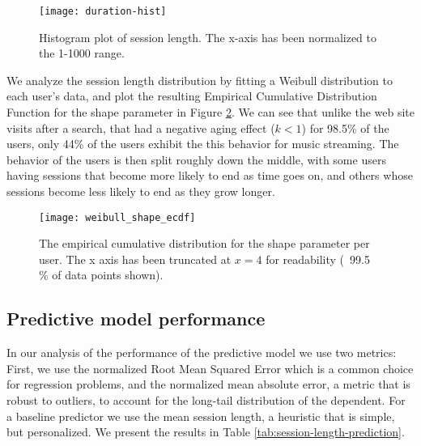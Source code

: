 \begin{figure}
	\centering
	\texttt{[image: duration-hist]}
	\caption{Histogram plot of session length. The x-axis has been normalized to the 1-1000 range.}
	\label{fig:session-length-times}
\end{figure}

We analyze the session length distribution by fitting a Weibull distribution
to each user's data, and plot the resulting Empirical Cumulative Distribution
Function for the shape parameter in Figure \ref{fig:session-length-shapes}.
We can see that unlike the web site visits after a search, that had a negative aging
effect ($k < 1$) for 98.5\% of the users, only 44\% of the users exhibit the
this behavior for music streaming. The behavior of the users is then split
roughly down the middle, with some users having sessions that become more likely
to end as time goes on, and others whose sessions become less likely to end as
they grow longer.


\begin{figure}
	\centering
	\texttt{[image: weibull\_shape\_ecdf]}
	\caption{The empirical cumulative distribution for the shape parameter per user.
		The x axis has been truncated at $x=4$ for readability (~99.5 \% of data points shown).}
	\label{fig:session-length-shapes}
\end{figure}

\subsection{Predictive model performance}

In our analysis of the performance of the predictive model we use two metrics:
First, we use the normalized Root Mean Squared Error which is a common choice
for regression problems, and the normalized mean absolute error, a metric that is robust to outliers, to account
for the long-tail distribution of the dependent. For a baseline predictor we use the mean
session length, a heuristic that is simple, but personalized.
We present the results in Table
\ref{tab:session-length-prediction}.


